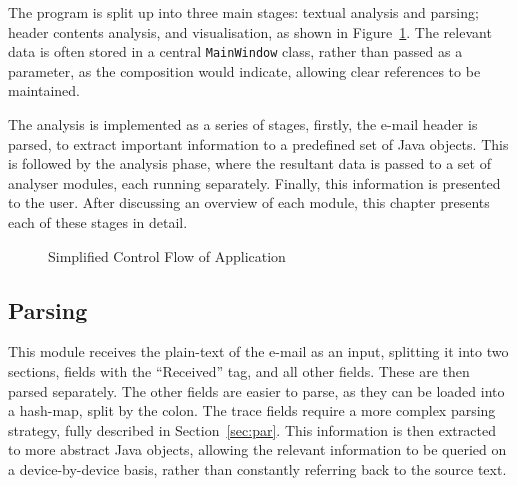 The program is split up into three main stages: textual analysis and parsing;
header contents analysis, and visualisation, as shown in Figure~\ref{fig:con}.
The relevant data is often stored in a central \texttt{MainWindow} class,
rather than passed as a parameter, as the composition would indicate, allowing
clear references to be maintained.

The  analysis is implemented as a series of stages, firstly, the e-mail header
is parsed, to extract important information to a predefined set of Java objects.
This is followed by the analysis phase, where the resultant data is passed to a
set of analyser modules, each running separately.  Finally, this information is
presented to the user.  After discussing an overview of each module, this chapter 
presents each of these stages in detail.

\begin{figure}
	\centering
{}
\caption{Simplified Control Flow of Application}
\label{fig:con}
\end{figure}

\subsection{Parsing}

This module receives the plain-text of the e-mail as an input, splitting it
into two sections, fields with the ``Received'' tag, and all other fields.
These are then parsed separately.  The other fields are easier to parse, as
they can be loaded into a hash-map, split by the colon.  The trace fields
require a more complex parsing strategy, fully described in
Section~\ref{sec:par}.  This information is then extracted to more abstract
Java objects, allowing the relevant information to be queried on a
device-by-device basis, rather than constantly referring back to the source
text.

